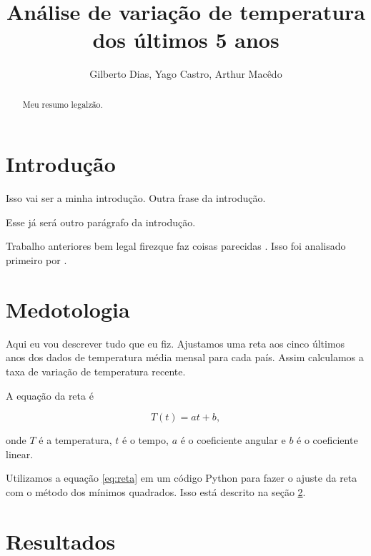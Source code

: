 \documentclass{article}
\begin{document}

\title{Análise de variação de temperatura dos últimos 5 anos}
\author{Gilberto Dias, Yago Castro, Arthur Macêdo}

\maketitle

\begin{abstract}
Meu resumo legalzão.
\end{abstract}

\section{Introdução}
Isso vai ser a minha introdução. 
Outra frase da introdução. 

Esse já será outro parágrafo da introdução.

Trabalho anteriores bem legal firezque faz coisas parecidas
\citep{Hansen2010}.
Isso foi analisado primeiro por \citet{Hansen2010}.

\section{Medotologia}
\label{sec:metodos}

Aqui eu vou descrever tudo que eu fiz.
Ajustamos uma reta aos cinco últimos anos dos dados
de temperatura média mensal para cada país.
Assim calculamos a taxa de variação de temperatura recente. 

A equação da reta é


\begin{equation}
T (t) = a t + b,
\label{eq:reta}
\end{equation}

\noindent
onde $T$ é a temperatura, $t$ é o tempo, $a$ é o coeficiente angular e 
$b$ é o coeficiente linear.

Utilizamos a equação \ref{eq:reta} em um código Python para fazer o ajuste da
reta com o método dos mínimos quadrados. Isso está descrito na seção \ref{sec:metodos}.

\section{Resultados}
\end{document}
